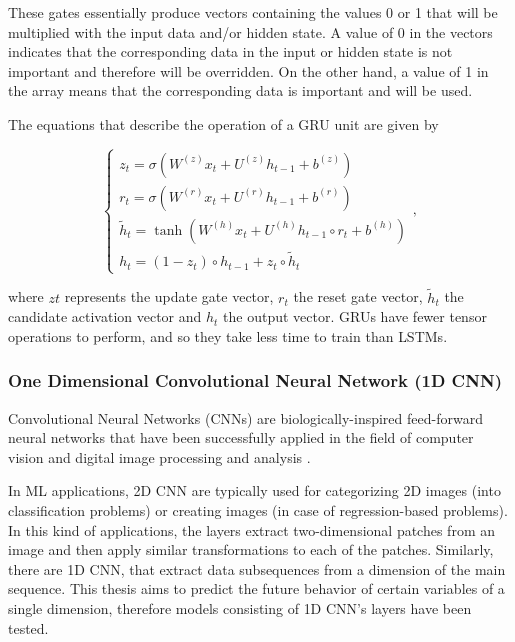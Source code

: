 These gates essentially produce vectors containing the values 0 or 1 that will be multiplied with the input data and/or hidden state. A value of 0 in the vectors indicates that the corresponding data in the input or hidden state is not important and therefore will be overridden. On the other hand, a value of 1 in the array means that the corresponding data is important and will be used.


The equations that describe the operation of a \ac{GRU} unit are given by 

\begin{equation}
    \begin{cases} 
        
        z_t = \sigma(W^{(z)} x_t + U^{(z)} h_{t-1} + b^{(z)})\\
        r_t = \sigma(W^{(r)} x_t + U^{(r)} h_{t-1} + b^{(r)})\\
        \tilde{h}_t = \tanh(W^{(h)} x_t + U^{(h)} h_{t-1} \circ r_t + b^{(h)})\\
        h_t = (1-z_t) \circ h_{t-1} + z_t \circ \tilde{h}_t

    \end{cases} ,
\end{equation}

where $zt$ represents the update gate vector, $r_t$ the reset gate vector, $\tilde{h}_t$ the candidate activation vector and $h_t$ the output vector. \ac{GRU}s have fewer tensor operations to perform, and so they take less time to train than \ac{LSTM}s.  

\subsubsection{One Dimensional Convolutional Neural Network (1D CNN)}\label{chap3:subsubsec:1dcnn}


Convolutional Neural Networks (\ac{CNN}s) are biologically-inspired feed-forward neural networks that have been successfully applied in the field of computer vision and digital image processing and analysis \cite{cnn0}.

In \ac{ML} applications, \ac{2D CNN} are typically used for categorizing 2D images (into classification problems) or creating images (in case of regression-based problems). In this kind of applications, the layers extract two-dimensional patches from an image and then apply similar transformations to each of the patches. Similarly, there are \ac{1D CNN}, that extract data subsequences from a dimension of the main sequence. This thesis aims to predict the future behavior of certain variables of a single dimension, therefore models consisting of \ac{1D CNN}'s layers have been tested.

